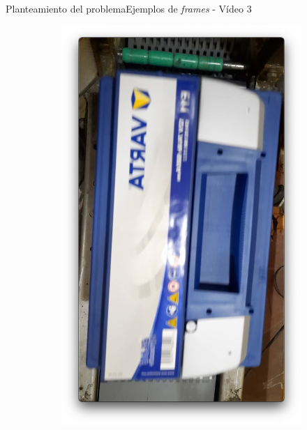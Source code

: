 \documentclass{beamer}
\begin{document}
\begin{frame}{Planteamiento del problema}{Ejemplos de \textit{frames} - Vídeo 3}
\begin{figure}
\centering
    \begin{subfigure}[t]{0.4\textwidth}
        \includegraphics[width=\textwidth]{img/B5.png}
    \end{subfigure}
    \begin{subfigure}[b]{0.4\textwidth}

\end{subfigure}
\end{figure}
\end{frame}
\end{document}
